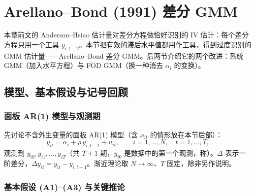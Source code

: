 \section{Arellano--Bond (1991) 差分 GMM}\label{sec:U12b-ab}

本章前文的 Anderson--Hsiao 估计量对差分方程做恰好识别的 IV 估计：每个差分方程只用一个工具 $y_{i,t-2}$。本节把有效的滞后水平值都用作工具，得到过度识别的 GMM 估计量——Arellano--Bond 差分 GMM。后两节介绍它的两个改进：系统 GMM（加入水平方程）与 FOD GMM（换一种消去 $\alpha_i$ 的变换）。

\subsection{模型、基本假设与记号回顾}

\subsubsection{面板 AR(1) 模型与观测期}

先讨论不含外生变量的面板 AR(1) 模型（含 $x_{it}$ 的情形放在本节后部）：
\begin{equation}\label{eq:U12b-ar1}
y_{it}=\alpha_i+\rho\,y_{i,t-1}+u_{it},\qquad i=1,\dots,N,\quad t=1,\dots,T,
\end{equation}
观测到 $y_{i0},y_{i1},\dots,y_{iT}$（共 $T+1$ 期，$y_{i0}$ 是数据中的第一个观测，称）。$\Delta$ 表示一阶差分，$\Delta y_{it}=y_{it}-y_{i,t-1}$。渐近理论取 $N\to\infty$、$T$ 固定，除非另作说明。

\subsubsection{基本假设 (A1)--(A3) 与关键推论}

